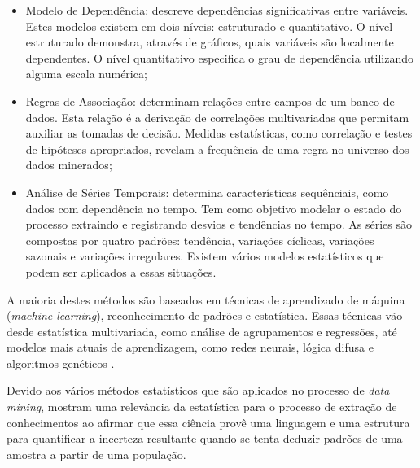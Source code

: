 \begin{itemize}
	\item Modelo de Dependência: descreve dependências significativas entre variáveis. Estes modelos existem em dois níveis: estruturado e quantitativo. O nível estruturado demonstra, através de gráficos, quais variáveis são localmente dependentes. O nível quantitativo especifica o grau de dependência utilizando alguma escala numérica;
	
	\item Regras de Associação: determinam relações entre campos de um banco de dados. Esta relação é a derivação de correlações multivariadas que permitam auxiliar as tomadas de decisão. Medidas estatísticas, como correlação e testes de hipóteses apropriados, revelam a frequência de uma regra no universo dos dados minerados;
	
	\item Análise de Séries Temporais: determina características sequênciais, como dados com dependência no tempo. Tem como objetivo modelar o estado do processo extraindo e registrando desvios e tendências no tempo. As séries são compostas por quatro padrões: tendência, variações cíclicas, variações sazonais e variações irregulares. Existem vários modelos estatísticos que podem ser aplicados a essas situações.
\end{itemize}

A maioria destes métodos são baseados em técnicas de aprendizado de máquina (\textit{machine learning}), reconhecimento de padrões e estatística. Essas técnicas vão desde estatística multivariada, como análise de agrupamentos e regressões, até modelos mais atuais de aprendizagem, como redes neurais, lógica difusa e algoritmos genéticos \cite{conceito-data-mining}.

Devido aos vários métodos estatísticos que são aplicados no processo de \textit{data mining},  mostram uma relevância da estatística para o processo de extração de conhecimentos ao afirmar que essa ciência provê uma linguagem e uma estrutura para quantificar a incerteza resultante quando se tenta deduzir padrões de uma amostra a partir de uma população.

